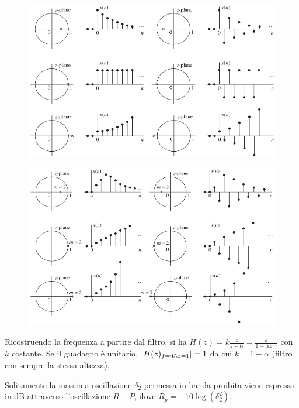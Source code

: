 \begin{figure}[h]
	\centering
	\includegraphics[scale=0.45]{Lezioni/Immagini/polizeri1}
\end{figure}
\begin{figure}[h]
	\centering
	\includegraphics[scale=0.45]{Lezioni/Immagini/polizeri2}
	\vspace{0.5cm}
	\hspace*{0.5cm} 
\end{figure}

\newpage
Ricostruendo la frequenza a partire dal filtro, si ha $H(z) = k \frac{z}{z - \alpha} = \frac{k}{1 - \alpha z^{-1}}$ con $k$ costante. Se il guadagno è unitario, $\left|H(z)_{f=0 \land z=1}\right| = 1$ da cui $k = 1 - \alpha$ (filtro con sempre la stessa altezza).

Solitamente la massima oscillazione $\delta_2$ permessa in banda proibita viene espressa in dB attraverso l'oscillazione $R-P$, dove $R_p = -10\log(\delta_2^2)$. 

